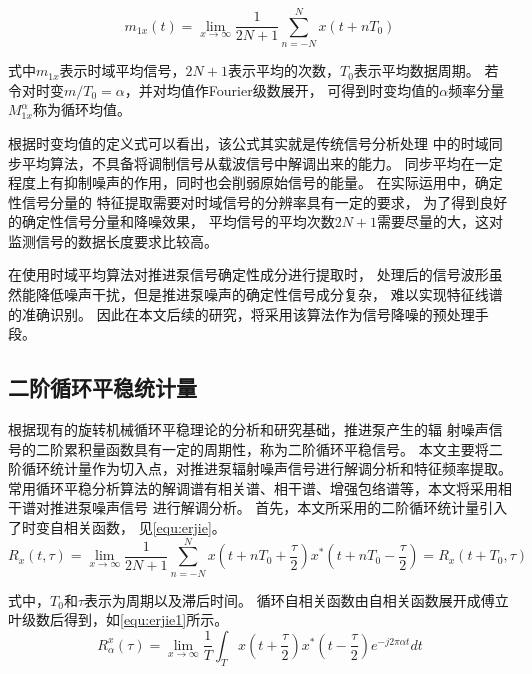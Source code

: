 \begin{equation}
    \label{equ:yijie}
    m_{1x} \left ( t \right ) =\lim_{x \to \infty} \frac{1}{2N+1}\sum_{n=-N}^{N}x\left ( t+nT_{0}  \right )   
\end{equation}

式中$m_{1x}$表示时域平均信号，$2N+1$表示平均的次数，$T_{0}$表示平均数据周期。
若令对时变$m/T_{0} =\alpha$，并对均值作Fourier级数展开，
可得到时变均值的$\alpha$频率分量$M_{1x}^{\alpha}$称为循环均值。

根据时变均值的定义式可以看出，该公式其实就是传统信号分析处理
中的时域同步平均算法，不具备将调制信号从载波信号中解调出来的能力。
同步平均在一定程度上有抑制噪声的作用，同时也会削弱原始信号的能量。
在实际运用中，确定性信号分量的
特征提取需要对时域信号的分辨率具有一定的要求，
为了得到良好的确定性信号分量和降噪效果，
平均信号的平均次数$2N+1$需要尽量的大，这对监测信号的数据长度要求比较高\cite{陈进2013机械故障特征提取的循环平稳理论及方法}。

在使用时域平均算法对推进泵信号确定性成分进行提取时，
处理后的信号波形虽然能降低噪声干扰，但是推进泵噪声的确定性信号成分复杂，
难以实现特征线谱的准确识别。
因此在本文后续的研究，将采用该算法作为信号降噪的预处理手段。

\subsection{二阶循环平稳统计量}
根据现有的旋转机械循环平稳理论的分析和研究基础，推进泵产生的辐
射噪声信号的二阶累积量函数具有一定的周期性，称为二阶循环平稳信号。
本文主要将二阶循环统计量作为切入点，对推进泵辐射噪声信号进行解调分析和特征频率提取。
常用循环平稳分析算法的解调谱有相关谱、相干谱、增强包络谱等，本文将采用相干谱对推进泵噪声信号
进行解调分析。
首先，本文所采用的二阶循环统计量引入了时变自相关函数，
见\autoref{equ:erjie}。 
\begin{equation}
    \label{equ:erjie}
    R_{x} \left ( t,\tau  \right ) =\lim_{x \to \infty} \frac{1}{2N+1} \sum_{n=-N}^{N} x\left ( t+nT_0+\frac{\tau }{2}  \right )x^{\ast }\left ( t+nT_0-\frac{\tau }{2}  \right )=R_{x}\left ( t+T_0,\tau  \right )    
\end{equation}

式中，$T_0$和$\tau$表示为周期以及滞后时间。
循环自相关函数由自相关函数展开成傅立叶级数后得到，如\autoref{equ:erjie1}所示。
\begin{equation}
    \label{equ:erjie1}
    R_{\alpha }^{x} \left ( \tau  \right ) =\lim_{x \to \infty} \frac{1}{T}\int_{T}^{}x\left ( t+\frac{\tau }{2}  \right )x^{\ast } \left ( t-\frac{\tau }{2} \right ) e^{-j2\pi \alpha t} dt   
\end{equation}

